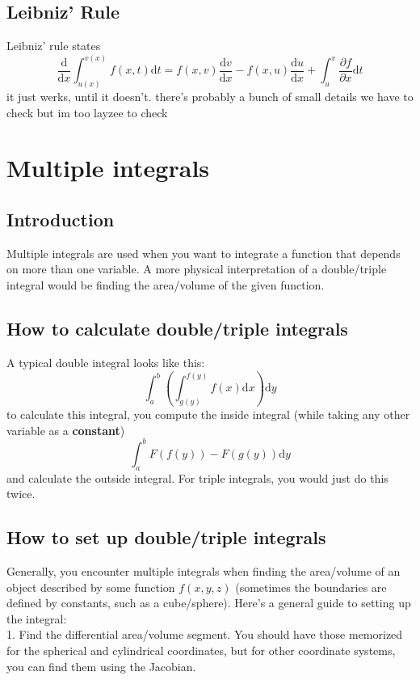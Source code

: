 \documentclass[oneside]{book}
\numberwithin{equation}{chapter} %
\begin{document}
\section{Leibniz' Rule}
Leibniz' rule states 
\begin{equation}
	\frac{\mathrm d}{\mathrm dx}\int^{v(x)}_{u(x)}f(x,t)\mathrm dt=f(x,v)\frac{\mathrm dv}{\mathrm dx}-f(x,u)\frac{\mathrm du}{\mathrm dx}+\int^v_u\frac{\partial f}{\partial x}\mathrm dt
\end{equation}
it just werks, until it doesn't. there's probably a bunch of small details we have to check but im too layzee to check
\chapter{Multiple integrals}
\section{Introduction}
Multiple integrals are used when you want to integrate a function that depends on more than one variable. A more physical interpretation of a double/triple integral would be finding the area/volume of the given function. 
\section{How to calculate double/triple integrals}
A typical double integral looks like this:
$$\int^b_a\left(\int^{f(y)}_{g(y)}f(x)\mathrm dx\right)\mathrm dy$$
to calculate this integral, you compute the inside integral (while taking any other variable as a \textbf{constant})
$$\int^b_aF(f(y))-F(g(y))\mathrm dy$$
and calculate the outside integral. For triple integrals, you would just do this twice. 
\section{How to set up double/triple integrals}
Generally, you encounter multiple integrals when finding the area/volume of an object described by some function $f(x,y,z)$ (sometimes the boundaries are defined by constants, such as a cube/sphere). Here's a general guide to setting up the integral:\\

1. Find the differential area/volume segment. You should have those memorized for the spherical and cylindrical coordinates, but for other coordinate systems, you can find them using the Jacobian. \\
\end{document}
